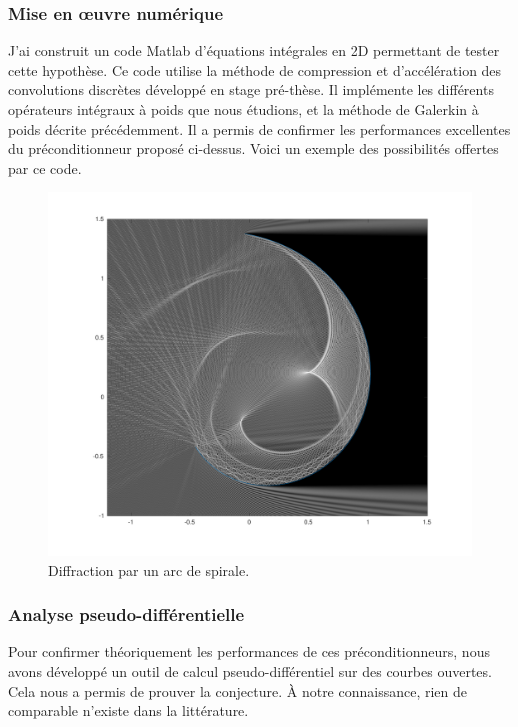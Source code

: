 \documentclass[utf8]{article}
\begin{document}
	\subsubsection{Mise en œuvre numérique}
	
	J'ai construit un code Matlab d'équations intégrales en 2D permettant de tester cette hypothèse. Ce code utilise la méthode de compression et d'accélération des convolutions discrètes développé en stage pré-thèse. Il implémente les diffé\-rents opérateurs intégraux à poids que nous étudions, et la méthode de Galerkin à poids décrite précédemment. Il a permis de confirmer les performances excellentes du préconditionneur proposé ci-dessus. Voici un exemple des possibilités offertes par ce code.
	
	\begin{figure}[h]
		\centering
		\includegraphics[scale = 0.2]{arcOfSpiral800_3}
		\caption{Diffraction par un arc de spirale. }
	\end{figure}

	\subsubsection{Analyse pseudo-différentielle}

	Pour confirmer théoriquement les performances de ces préconditionneurs, nous avons développé un outil de calcul pseudo-différentiel sur des courbes ouvertes. Cela nous a permis de prouver la conjecture. À notre connaissance, rien de comparable n'existe dans la littérature. 
	
\end{document}
